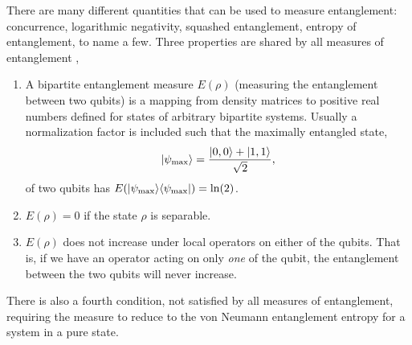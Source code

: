There are many different quantities that can be used to measure entanglement: concurrence, logarithmic negativity, squashed entanglement, entropy of entanglement, to name a few.
Three properties are shared by all measures of entanglement \cite{Plenio2005},
\begin{enumerate}
\item A bipartite entanglement measure $E(\rho)$ (measuring the entanglement between two qubits) is a mapping from density matrices to positive real numbers defined for states of arbitrary bipartite systems.
Usually a normalization factor is included such that the maximally entangled state,
\begin{equation}
\lvert {\psi_{\rm max}} \rangle  = \frac{\lvert {0,0} \rangle + \lvert {1,1} \rangle}{\sqrt{2}},
\end{equation}
 of two qubits has $E(\lvert {\psi_{\rm max}} \rangle\langle {\psi_{\rm max}} \rvert) = \ln(2)$.
 \item  $E(\rho)=0$ if the state $\rho$ is separable.
 \item $E(\rho)$ does not increase under local operators on either of the qubits.  That is, if we have an operator acting on only {\it one} of the qubit, the entanglement between the two qubits will never increase.
\end{enumerate}
There is also a fourth condition, not satisfied by all measures of entanglement, requiring the measure to reduce to the von Neumann entanglement entropy for a system in a pure state.


